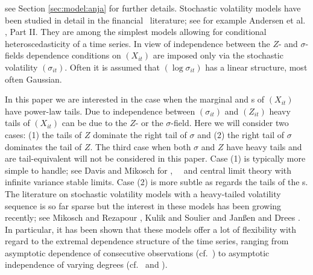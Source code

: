 see Section \ref{sec:model:anja} for further details.  Stochastic
volatility models have been studied in detail in the financial \ts\
literature; see for example Andersen et
al. \cite{andersen:davis:kreiss:mikosch:2009}, Part II. They are among
the simplest models allowing for conditional heteroscedasticity of a
time series. In view of independence between the $Z$- and
$\sigma$-fields dependence conditions on $(X_{it})$ are imposed only
via the stochastic volatility $(\sigma_{it})$. Often it is assumed
that $(\log \sigma_{it})$ has a linear structure, most often Gaussian.
\par
In this paper we are interested in the case when the marginal and
\fidi s of $(X_{it})$ have power-law tails.
Due to independence between  $(\sigma_{it})$ and $(Z_{it})$ heavy
tails of $(X_{it})$ can be due to the $Z$- or the $\sigma$-field. 
Here we will consider two cases: (1) the tails of $Z$ dominate the
right tail of $\sigma$ and (2) the right tail of $\sigma$ dominates
the tail of $Z$. The third case when both $\sigma$ and $Z$ have heavy
tails and are tail-equivalent will not be considered in this
paper. Case (1) is typically more simple to handle; see Davis and Mikosch
\cite{davis:mikosch:1999,davis:mikosch:2001,davis:mikosch:2009} for
\evt , \pp\ \con\ and central limit theory 
with infinite variance stable limits. Case (2) is more subtle as
regards the tails of the \fidi s. The literature on stochastic
volatility models with a heavy-tailed volatility sequence is so far
sparse but the interest in these models has been growing recently; see
Mikosch and Rezapour \cite{mikosch:rezapour:2013}, Kulik and Soulier
\cite{kulik:soulier:2015} and Jan\ss en and Drees
\cite{janssen:drees:2016}. In particular, it has been shown that these
models offer a lot of flexibility with regard to the extremal
dependence structure of the time series, ranging from asymptotic
dependence of consecutive observations (cf.\
\cite{mikosch:rezapour:2013}) to asymptotic independence of varying
degrees (cf.\ \cite{kulik:soulier:2015} and
\cite{janssen:drees:2016}).



